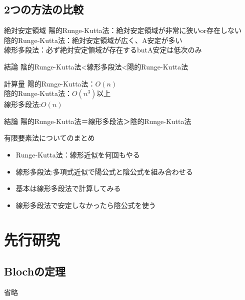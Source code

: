 \documentclass[unicode, 12pt, aspectratio=169]{beamer}
\begin{document}
\subsection{2つの方法の比較}
\frame{\insertsubsection}
\begin{frame}
    \begin{block}{絶対安定領域}
    陽的Runge-Kutta法：絶対安定領域が非常に狭いor存在しない\\
    陰的Runge-Kutta法：絶対安定領域が広く、A安定が多い\\
      線形多段法：必ず絶対安定領域が存在する\alert{but}A安定は低次のみ
    \end{block}
    \begin{block}{結論}
    陰的Runge-Kutta法<線形多段法<陽的Runge-Kutta法
    \end{block}
\end{frame}

\begin{frame}
  \begin{block}{計算量}
    陽的Runge-Kutta法：$O(n)$\\
    陰的Runge-Kutta法：$O(n^3)$以上\\
    線形多段法:$O(n)$
  \end{block}
    \begin{block}{結論}
    陽的Runge-Kutta法＝線形多段法＞陰的Runge-Kutta法
    \end{block}
\end{frame}

\begin{frame}
   \begin{block}{有限要素法についてのまとめ}
      \begin{itemize}
        \item Runge-Kutta法：線形近似を何回もやる
        \item 線形多段法:多項式近似で陽公式と陰公式を組み合わせる
        \item 基本は線形多段法で計算してみる
        \item 線形多段法で安定しなかったら陰公式を使う
      \end{itemize}
    \end{block}
\end{frame}

\section{先行研究}
\subsection{Blochの定理}
\frame{\insertsubsection}
\begin{frame}
  \begin{block}
  省略
  \end{block}
\end{frame}
\end{document}
